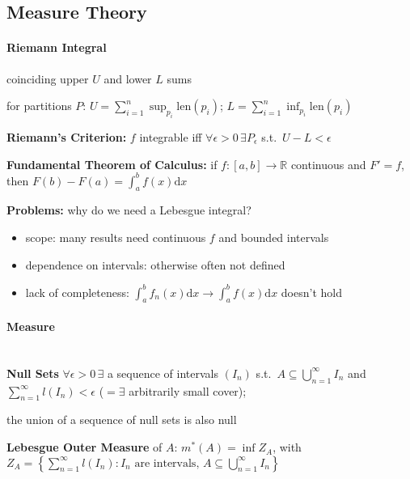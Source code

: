 \documentclass[8pt,twoside]{extarticle}
\begin{document}
\subsection[Measure Theory]{Measure Theory \citep{capinski_measure_2004}}

\begin{multicols}{2}


\paragraph{Riemann Integral} coinciding upper $U$ and lower $L$ sums

for partitions $P$: $U=\sum_{i=1}^n \sup_{p_i} \mathrm{len}(p_i)$; $L=\sum_{i=1}^n \inf_{p_i} \mathrm{len}(p_i)$

\textbf{Riemann's Criterion:} $f$ integrable iff $\forall \epsilon> 0 \,\exists P_\epsilon$ s.t.\ $U{-}L <\epsilon$

\textbf{Fundamental Theorem of Calculus:} if $f:[a,b]\to \mathbb{R}$ continuous and $F'=f$, then $F(b)-F(a)=\int_a^bf(x)\mathrm{d} x$

\textbf{Problems:} why do we need a Lebesgue integral?
\begin{itemize}[itemsep=0em, topsep=0pt, partopsep=0pt,parsep=0pt, leftmargin=1.0em]
\item scope: many results need continuous $f$ and bounded intervals
\item dependence on intervals: otherwise often not defined
\item lack of completeness: $\int_a^b f_n(x) \mathrm{d}x \to \int_a^b f(x) \mathrm{d}x$ doesn't hold
\end{itemize} 

\paragraph{Measure} \ \\

\textbf{Null Sets} $\forall \epsilon>0 \,\exists$ a sequence of intervals $(I_n)$ s.t.\ \newline $A\subseteq \bigcup_{n=1}^\infty I_n$ and $\sum_{n=1}^\infty l(I_n)<\epsilon$ ($=\exists$ arbitrarily small cover);

the union of a sequence of null sets is also null

\textbf{Lebesgue Outer Measure} of $A$: $m^*(A)=\inf Z_A$, with 
$Z_A = \left\{ \sum_{n=1}^\infty l(I_n): I_n \text{ are intervals, } A\subseteq \bigcup_{n=1}^\infty I_n \right\}$


\end{multicols}
\end{document}
